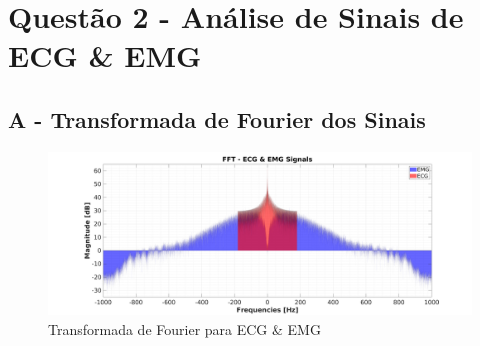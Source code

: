 \documentclass{article}
\begin{document}
\section*{Questão 2 - Análise de Sinais de ECG \& EMG}
\subsection*{A - Transformada de Fourier dos Sinais}
\begin{figure}[H]
	\begin{center}
		\includegraphics[scale=0.25]{../Q2_FFT_EMG-ECG.png}
		\caption{Transformada de Fourier para ECG \& EMG}
		\label{fig:Q2_FFT}
	\end{center}
\end{figure}
\end{document}
